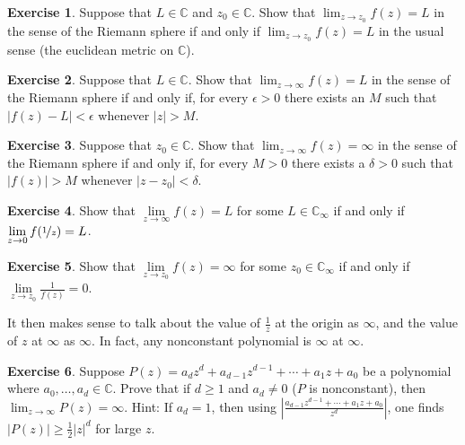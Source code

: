 \documentclass[12pt,openany]{book}
\newcommand{\sabs}[1]{\lvert {#1} \rvert}
\newcommand{\abs}[1]{\left\lvert {#1} \right\rvert}
\newcommand{\C}{{\mathbb{C}}}
\theoremstyle{plain}
\theoremstyle{remark}
\theoremstyle{definition}
\newenvironment{exbox}{%
    \def\FrameCommand{\vrule width 1pt \relax\hspace {10pt}}%
    \MakeFramed {\advance \hsize -\width \FrameRestore }%
}{%
    \endMakeFramed
}
\theoremstyle{exercise}
\newtheorem{exercise}{Exercise}[section]
\theoremstyle{example}
\begin{document}
\begin{exbox}
\begin{exercise}
Suppose that $L \in \C$ and $z_0 \in \C$.
Show that $\lim_{z\to z_0} f(z) = L$ in the sense of the Riemann sphere
if and only if $\lim_{z \to z_0} f(z) = L$ in the usual sense (the euclidean
metric on $\C$).
\end{exercise}

\begin{exercise}
Suppose that $L \in \C$.
Show that $\lim_{z\to \infty} f(z) = L$ in the sense of the Riemann sphere
if and only if, for every $\epsilon > 0$ there exists an $M$ such that
$\sabs{f(z)-L} < \epsilon$ whenever $\sabs{z} > M$.
\end{exercise}

\begin{exercise}
Suppose that $z_0 \in \C$.
Show that $\lim_{z\to \infty} f(z) = \infty$ in the sense of the Riemann sphere
if and only if, for every $M > 0$ there exists a $\delta > 0$ such that
$\sabs{f(z)} > M$ whenever $\sabs{z-z_0} < \delta$.
\end{exercise}

\begin{exercise}
Show that $\lim\limits_{z\to\infty} f(z) = L$ for some $L \in \C_\infty$ if and only if
$\lim\limits_{z \to 0} f(\nicefrac{1}{z}) = L$.
\end{exercise}

\begin{exercise}
Show that $\lim\limits_{z\to z_0} f(z) = \infty$ for some $z_0 \in \C_\infty$ if and only if
$\lim\limits_{z \to z_0} \frac{1}{f(z)} = 0$.
\end{exercise}
\end{exbox}

It then makes sense to talk about the value of $\frac{1}{z}$ at the origin
as $\infty$, and the value of $z$ at $\infty$ as $\infty$.
In fact, any nonconstant polynomial is $\infty$ at $\infty$.

\begin{exbox}
\begin{exercise} \label{exercise:polygoesinf}
Suppose $P(z) = a_d z^d + a_{d-1} z^{d-1} + \cdots + a_1 z + a_0$ be
a polynomial where $a_0,\ldots,a_d \in \C$.  Prove that if $d \geq 1$
and $a_d \not=0$ ($P$ is nonconstant),
then $\lim_{z \to \infty} P(z) = \infty$.
Hint: If $a_d = 1$, then using
$\abs{\frac{a_{d-1} z^{d-1} + \cdots + a_1 z + a_0}{z^d}}$, one finds
$\abs{P(z)} \geq \frac{1}{2} \sabs{z}^d$ for large $z$.
\end{exercise}
\end{exbox}
\end{document}
